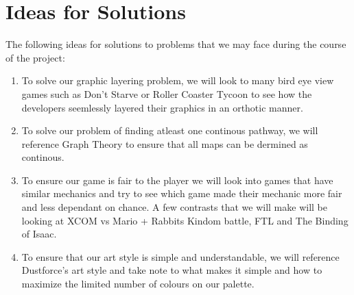 \documentclass{article}
\begin{document}
\section{Ideas for Solutions}
\quad The following ideas for solutions to problems that we may face during the course of the project:
\begin{enumerate}
	\item To solve our graphic layering problem, we will look to many bird eye view games such as Don't Starve or Roller Coaster Tycoon to see how the developers seemlessly layered their graphics in an orthotic manner.
	\item To solve our problem of finding atleast one continous pathway, we will reference Graph Theory to ensure that all maps can be dermined as continous. 
	\item To ensure our game is fair to the player we will look into games that have similar mechanics and try to see which game made their mechanic more fair and less dependant on chance. A few contrasts that we will make will be looking at XCOM vs Mario + Rabbits Kindom battle, FTL and The Binding of Isaac. %
	\item To ensure that our art style is simple and understandable, we will reference Dustforce's art style and take note to what makes it simple and how to maximize the limited number of colours on our palette.
\end{enumerate}
\end{document}

